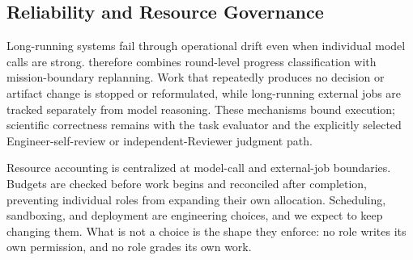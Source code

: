 \subsection{Reliability and Resource Governance}

Long-running systems fail through operational drift even when individual model
calls are strong. \systemname therefore combines round-level progress
classification with mission-boundary replanning. Work that repeatedly produces no
decision or artifact change is stopped or reformulated, while long-running external
jobs are tracked separately from model reasoning. These mechanisms bound execution;
scientific correctness remains with the task evaluator and the explicitly selected
Engineer-self-review or independent-Reviewer judgment path.

Resource accounting is centralized at model-call and external-job boundaries.
Budgets are checked before work begins and reconciled after completion, preventing
individual roles from expanding their own allocation. Scheduling, sandboxing, and
deployment are engineering choices, and we expect to keep changing them. What is not
a choice is the shape they enforce: no role writes its own permission, and no role
grades its own work.

